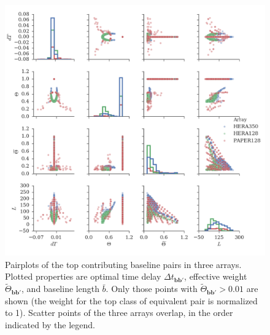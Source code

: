 \documentclass[twocolumn,apj,numberedappendix]{emulateapj}
\renewcommand\[{\begin{equation}}
\renewcommand\]{\end{equation}}
\begin{document}
\begin{figure}[H]
\includegraphics[width=\linewidth]{pairplot}

\caption{Pairplots of the top contributing baseline pairs in three arrays. Plotted properties are optimal time delay $\Delta t_{\boldsymbol{bb'}}$,  effective weight $\widetilde{\Theta}_{\boldsymbol{bb'}}$, and baseline length $\bar{b}$. Only those points with $\widetilde{\Theta}_{\boldsymbol{bb'}}>0.01$ are shown (the weight for the top class of equivalent pair is normalized to 1). Scatter points of the three arrays overlap, in the order indicated by the legend. }
\label{fig:pairplot}
\end{figure}
\end{document}

